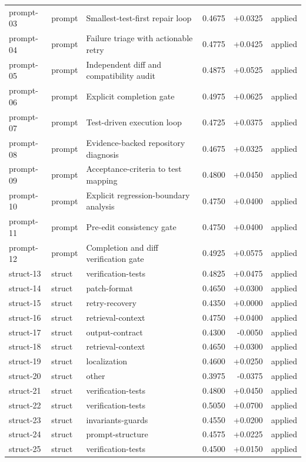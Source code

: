 \begin{center}
\begin{longtable}{llp{5.2cm}rrl}
prompt-03 & prompt & Smallest-test-first repair loop & 0.4675 & +0.0325 & applied \\
prompt-04 & prompt & Failure triage with actionable retry & 0.4775 & +0.0425 & applied \\
prompt-05 & prompt & Independent diff and compatibility audit & 0.4875 & +0.0525 & applied \\
prompt-06 & prompt & Explicit completion gate & 0.4975 & +0.0625 & applied \\
prompt-07 & prompt & Test-driven execution loop & 0.4725 & +0.0375 & applied \\
prompt-08 & prompt & Evidence-backed repository diagnosis & 0.4675 & +0.0325 & applied \\
prompt-09 & prompt & Acceptance-criteria to test mapping & 0.4800 & +0.0450 & applied \\
prompt-10 & prompt & Explicit regression-boundary analysis & 0.4750 & +0.0400 & applied \\
prompt-11 & prompt & Pre-edit consistency gate & 0.4750 & +0.0400 & applied \\
prompt-12 & prompt & Completion and diff verification gate & 0.4925 & +0.0575 & applied \\
struct-13 & struct & verification-tests & 0.4825 & +0.0475 & applied \\
struct-14 & struct & patch-format & 0.4650 & +0.0300 & applied \\
struct-15 & struct & retry-recovery & 0.4350 & +0.0000 & applied \\
struct-16 & struct & retrieval-context & 0.4750 & +0.0400 & applied \\
struct-17 & struct & output-contract & 0.4300 & -0.0050 & applied \\
struct-18 & struct & retrieval-context & 0.4650 & +0.0300 & applied \\
struct-19 & struct & localization & 0.4600 & +0.0250 & applied \\
struct-20 & struct & other & 0.3975 & -0.0375 & applied \\
struct-21 & struct & verification-tests & 0.4800 & +0.0450 & applied \\
struct-22 & struct & verification-tests & 0.5050 & +0.0700 & applied \\
struct-23 & struct & invariants-guards & 0.4550 & +0.0200 & applied \\
struct-24 & struct & prompt-structure & 0.4575 & +0.0225 & applied \\
struct-25 & struct & verification-tests & 0.4500 & +0.0150 & applied \\

\end{longtable}
\end{center}
